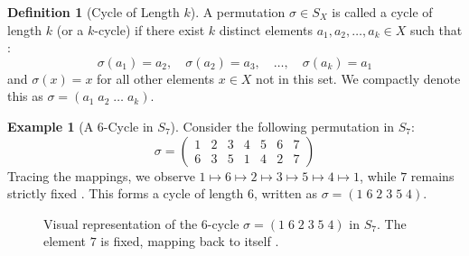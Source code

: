\documentclass[11pt]{article}
\theoremstyle{definition}
\newtheorem{definition}{Definition}[section]
\newtheorem{example}{Example}[section]
\theoremstyle{plain}
\theoremstyle{remark}
\begin{document}
\begin{definition}[Cycle of Length $k$]
A permutation $\sigma \in S_X$ is called a cycle of length $k$ (or a $k$-cycle) if there exist $k$ distinct elements $a_1, a_2, \dots, a_k \in X$ such that \cite{dummit}:
\begin{equation}
    \sigma(a_1) = a_2, \quad \sigma(a_2) = a_3, \quad \dots, \quad \sigma(a_k) = a_1
\end{equation}
and $\sigma(x) = x$ for all other elements $x \in X$ not in this set. We compactly denote this as $\sigma = (a_1 \; a_2 \; \dots \; a_k)$.
\end{definition}

\begin{example}[A 6-Cycle in $S_7$]
Consider the following permutation in $S_7$:
\begin{equation}
    \sigma = \begin{pmatrix} 1 & 2 & 3 & 4 & 5 & 6 & 7 \\ 6 & 3 & 5 & 1 & 4 & 2 & 7 \end{pmatrix}
\end{equation}
Tracing the mappings, we observe $1 \mapsto 6 \mapsto 2 \mapsto 3 \mapsto 5 \mapsto 4 \mapsto 1$, while $7$ remains strictly fixed \cite{gallian}. This forms a cycle of length 6, written as $\sigma = (1 \; 6 \; 2 \; 3 \; 5 \; 4)$.

\begin{figure}[H]
    \centering
    \caption{Visual representation of the 6-cycle $\sigma = (1 \; 6 \; 2 \; 3 \; 5 \; 4)$ in $S_7$. The element $7$ is fixed, mapping back to itself \cite{dummit}.}
\end{figure}
\end{example}
\end{document}
